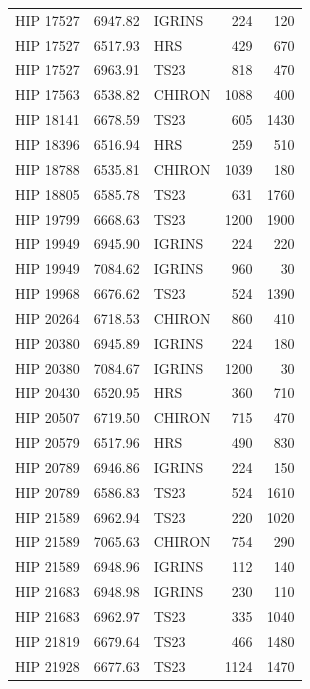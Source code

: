 \begin{scriptsize}
\begin{longtable}{|l|rlrr|}
   HIP 17527 &  6947.82 &     IGRINS &      224 &   120 \\
   HIP 17527 &  6517.93 &        HRS &      429 &   670 \\
   HIP 17527 &  6963.91 &       TS23 &      818 &   470 \\
   HIP 17563 &  6538.82 &     CHIRON &     1088 &   400 \\
   HIP 18141 &  6678.59 &       TS23 &      605 &  1430 \\
   HIP 18396 &  6516.94 &        HRS &      259 &   510 \\
   HIP 18788 &  6535.81 &     CHIRON &     1039 &   180 \\
   HIP 18805 &  6585.78 &       TS23 &      631 &  1760 \\
   HIP 19799 &  6668.63 &       TS23 &     1200 &  1900 \\
   HIP 19949 &  6945.90 &     IGRINS &      224 &   220 \\
   HIP 19949 &  7084.62 &     IGRINS &      960 &    30 \\
   HIP 19968 &  6676.62 &       TS23 &      524 &  1390 \\
   HIP 20264 &  6718.53 &     CHIRON &      860 &   410 \\
   HIP 20380 &  6945.89 &     IGRINS &      224 &   180 \\
   HIP 20380 &  7084.67 &     IGRINS &     1200 &    30 \\
   HIP 20430 &  6520.95 &        HRS &      360 &   710 \\
   HIP 20507 &  6719.50 &     CHIRON &      715 &   470 \\
   HIP 20579 &  6517.96 &        HRS &      490 &   830 \\
   HIP 20789 &  6946.86 &     IGRINS &      224 &   150 \\
   HIP 20789 &  6586.83 &       TS23 &      524 &  1610 \\
   HIP 21589 &  6962.94 &       TS23 &      220 &  1020 \\
   HIP 21589 &  7065.63 &     CHIRON &      754 &   290 \\
   HIP 21589 &  6948.96 &     IGRINS &      112 &   140 \\
   HIP 21683 &  6948.98 &     IGRINS &      230 &   110 \\
   HIP 21683 &  6962.97 &       TS23 &      335 &  1040 \\
   HIP 21819 &  6679.64 &       TS23 &      466 &  1480 \\
   HIP 21928 &  6677.63 &       TS23 &     1124 &  1470 \\

\end{longtable}
\end{scriptsize}
